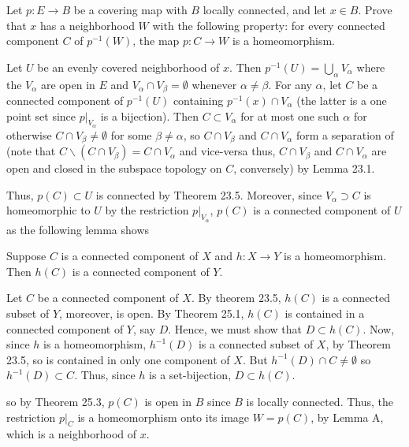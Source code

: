 \begin{problem}
Let $p\colon E\to B$ be a covering map with $B$ locally connected, and let
$x\in B$. Prove that $x$ has a neighborhood $W$ with the following
property: for every connected component $C$ of $p^{-1}(W)$, the map
$p\colon C\to W$ is a homeomorphism.
\end{problem}
\begin{solution}
Let $U$ be an evenly covered neighborhood of $x$. Then
$p^{-1}(U)=\bigcup_\alpha V_\alpha$ where the $V_\alpha$ are open in $E$
and  $V_\alpha\cap V_\beta=\emptyset$ whenever $\alpha\neq\beta$. For any
$\alpha$, let $C$ be a connected component of $p^{-1}(U)$ containing
$p^{-1}(x)\cap V_\alpha$ (the latter is a one point set since
$\left.p\right|_{V_\alpha}$ is a bijection). Then $C\subset V_\alpha$ for
at most one such $\alpha$ for otherwise $C\cap V_\beta\neq\emptyset$ for
some $\beta\neq\alpha$, so $C\cap V_\beta$ and $C\cap V_\alpha$ form a
separation of (note that $C\smallsetminus(C\cap V_\beta)=C\cap V_\alpha$ and
vice-versa thus, $C\cap V_\beta$ and $C\cap V_\alpha$ are open and closed
in the subspace topology on $C$, conversely) by Lemma 23.1.

Thus, $p(C)\subset U$ is connected by Theorem 23.5. Moreover, since
$V_\alpha\supset C$ is homeomorphic to $U$ by the restriction
$\left.p\right|_{V_\alpha}$, $p(C)$ is a connected component of $U$ as the
following lemma shows
\begin{lemma}
Suppose $C$ is a connected component of $X$ and $h\colon X\to Y$ is a
homeomorphism. Then $h(C)$ is a connected component of $Y$.
\end{lemma}
\begin{solution}
\renewcommand\qedsymbol{$\clubsuit$}
Let $C$ be a connected component of $X$. By theorem 23.5, $h(C)$ is a
connected subset of $Y$, moreover, is open. By Theorem 25.1, $h(C)$ is
contained in a connected component of $Y$, say $D$. Hence, we must show
that $D\subset h(C)$. Now, since $h$ is a homeomorphism, $h^{-1}(D)$ is a
connected subset of $X$, by Theorem 23.5, so is contained in only one
component of $X$. But $h^{-1}(D)\cap C\neq\emptyset$ so $h^{-1}(D)\subset
C$. Thus, since $h$ is a set-bijection, $D\subset h(C)$.
\end{solution}
so by Theorem 25.3, $p(C)$ is open in $B$ since $B$ is locally
connected. Thus, the restriction $\left.p\right|_{C}$ is a homeomorphism
onto its image $W= p(C)$, by Lemma A, which is a neighborhood of $x$.
\end{solution}

